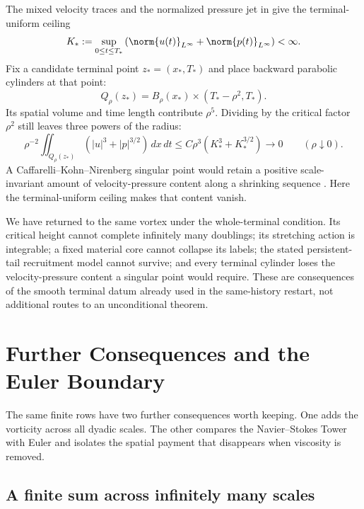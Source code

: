 The mixed velocity traces and the normalized pressure jet in
 give the terminal-uniform ceiling
\begin{equation}\label{eq:FiniteIntervalVelocityPressureSupremum}
  K_*
  :=\sup_{0\leq t\leq T_*}
  \left(
    \norm{u(t)}_{L^\infty}
    +\norm{p(t)}_{L^\infty}
  \right)
  <\infty.
\end{equation}
Fix a candidate terminal point \(z_*=(x_*,T_*)\) and place backward parabolic
cylinders at that point:
\[
  Q_\rho(z_*)
  =B_\rho(x_*)\times(T_*-\rho^2,T_*).
\]
Its spatial volume and time length contribute \(\rho^5\).  Dividing by the
critical factor \(\rho^2\) still leaves three powers of the radius:
\begin{equation}\label{eq:VanishingLocalScaleInvariantContent}
  \rho^{-2}
  \iint_{Q_\rho(z_*)}
  \left(|u|^3+|p|^{3/2}\right)\,dx\,dt
  \leq
  C\rho^3\left(K_*^3+K_*^{3/2}\right)
  \longrightarrow0
  \qquad(\rho\downarrow0).
\end{equation}
A Caffarelli--Kohn--Nirenberg singular point would retain a positive
scale-invariant amount of velocity-pressure content along a shrinking sequence
\parencite{CaffarelliKohnNirenberg1982}.  Here the terminal-uniform ceiling
makes that content vanish.

We have returned to the same vortex under the whole-terminal condition.  Its
critical height cannot complete infinitely many doublings; its stretching
action is integrable; a fixed material core cannot collapse its labels; the
stated persistent-tail recruitment model cannot survive; and every terminal
cylinder loses the velocity-pressure content a singular point would require.
These are consequences of the smooth terminal datum already used in the
same-history restart, not additional routes to an unconditional theorem.

\clearpage
\section{Further Consequences and the Euler Boundary}\label{sec:FurtherConsequencesAndEulerBoundary}

The same finite rows have two further consequences worth keeping.  One adds
the vorticity across all dyadic scales.  The other compares the Navier--Stokes
Tower with Euler and isolates the spatial payment that disappears when
viscosity is removed.

\subsection{A finite sum across infinitely many scales}\label{sub:AFiniteSumAcrossScales}


